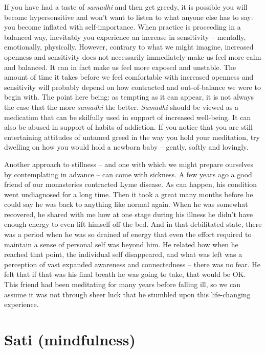If you have had a taste of \emph{samadhi} and then get greedy, it is
possible you will become hypersensitive and won't want to listen to what
anyone else has to say: you become inflated with self-importance. When
practice is proceeding in a balanced way, inevitably you experience an
increase in sensitivity -- mentally, emotionally, physically. However,
contrary to what we might imagine, increased openness and sensitivity
does not necessarily immediately make us feel more calm and balanced. It
can in fact make us feel more exposed and unstable. The amount of time
it takes before we feel comfortable with increased openness and
sensitivity will probably depend on how contracted and out-of-balance we
were to begin with. The point here being: as tempting as it can appear,
it is not always the case that the more \emph{samadhi} the better.
\emph{Samadhi} should be viewed as a medication that can be skilfully
used in support of increased well-being. It can also be abused in
support of habits of addiction. If you notice that you are still
entertaining attitudes of untamed greed in the way you hold your
meditation, try dwelling on how you would hold a newborn baby -- gently,
softly and lovingly.

Another approach to stillness -- and one with which we might prepare
ourselves by contemplating in advance -- can come with sickness. A few
years ago a good friend of our monasteries contracted
Lyme disease\cite{lyme}. As can happen, his condition went
undiagnosed for a long time. Then it took a great many months before he
could say he was back to anything like normal again. When he was
somewhat recovered, he shared with me how at one stage during his
illness he didn't have enough energy to even lift himself off the bed.
And in that debilitated state, there was a period when he was so drained
of energy that even the effort required to maintain a sense of personal
self was beyond him. He related how when he reached that point, the
individual self disappeared, and what was left was a perception of vast
expanded awareness and connectedness -- there was no fear. He felt that
if that was his final breath he was going to take, that would be OK.
This friend had been meditating for many years before falling ill, so we
can assume it was not through sheer luck that he stumbled upon this
life-changing experience.

\section{Sati (mindfulness)}

